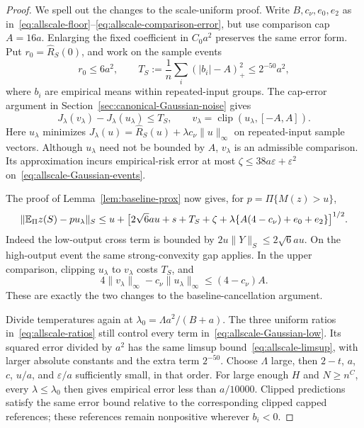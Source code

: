 \begin{proof}
We spell out the changes to the scale-uniform proof. Write $B,c_\nu,e_0,e_2$ as in~\eqref{eq:allscale-floor}--\eqref{eq:allscale-comparison-error}, but use comparison cap $A=16a$. Enlarging the fixed coefficient in $C_0a^2$ preserves the same error form. Put $r_0=\widehat R_S(0)$, and work on the sample events
\begin{equation}
 r_0\le6a^2,\qquad
 T_S:=\frac1n\sum_i(|b_i|-A)_+^2\le2^{-50}a^2,
 \label{eq:allscale-Gaussian-events}
\end{equation}
where $b_i$ are empirical means within repeated-input groups. The cap-error argument in Section~\ref{sec:canonical-Gaussian-noise} gives
\[
 J_\lambda(v_\lambda)-J_\lambda(u_\lambda)\le T_S,
 \qquad v_\lambda=\operatorname{clip}(u_\lambda,[-A,A]).
\]
Here $u_\lambda$ minimizes $J_\lambda(u)=\widehat R_S(u)+\lambda c_\nu\|u\|_\infty$ on repeated-input sample vectors. Although $u_\lambda$ need not be bounded by $A$, $v_\lambda$ is an admissible comparison. Its approximation incurs empirical-risk error at most
$\zeta\le38a\varepsilon+\varepsilon^2$ on~\eqref{eq:allscale-Gaussian-events}.

The proof of Lemma~\ref{lem:baseline-prox} now gives, for $p=\Pi\{M(z)>u\}$,
\begin{align}
 \|\mathbb E_\Pi z(S)-p u_\lambda\|_S
 \le u+\bigl[2\sqrt6au+s+T_S+\zeta
       +\lambda\{A(4-c_\nu)+e_0+e_2\}\bigr]^{1/2}.
 \label{eq:allscale-Gaussian-low}
\end{align}
Indeed the low-output cross term is bounded by $2u\|Y\|_S\le2\sqrt6au$. On the high-output event the same strong-convexity gap applies. In the upper comparison, clipping $u_\lambda$ to $v_\lambda$ costs $T_S$, and
\[
 4\|v_\lambda\|_\infty-c_\nu\|u_\lambda\|_\infty
 \le(4-c_\nu)A.
\]
These are exactly the two changes to the baseline-cancellation argument.

Divide temperatures again at $\lambda_0=\Lambda a^2/(B+a)$. The three uniform ratios in~\eqref{eq:allscale-ratios} still control every term in~\eqref{eq:allscale-Gaussian-low}. Its squared error divided by $a^2$ has the same limsup bound~\eqref{eq:allscale-limsup}, with larger absolute constants and the extra term $2^{-50}$. Choose $\Lambda$ large, then $2-t$, $a$, $c$, $u/a$, and $\varepsilon/a$ sufficiently small, in that order. For large enough $H$ and $N\ge n^C$, every $\lambda\le\lambda_0$ then gives empirical error less than $a/10000$. Clipped predictions satisfy the same error bound relative to the corresponding clipped capped references; these references remain nonpositive wherever $b_i<0$.


\end{proof}
